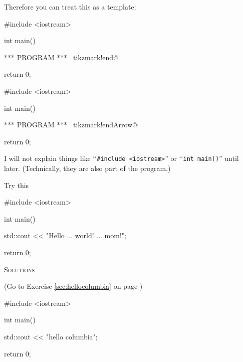 Therefore you can treat this as a template:


\begin{console}[commandchars=\~\!\@]
#include <iostream>

int main()
{

    *** PROGRAM *** ~tikzmark!end@

    return 0;
}
\end{console}
\begin{console}[commandchars=\~\!\@]
#include <iostream>

int main()
{

    *** PROGRAM *** ~tikzmark!endArrow@
    
    return 0;
}
\end{console}

I will not explain things like \lq\lq \verb!#include <iostream>!'' or \lq\lq\verb!int main()!'' until later. (Technically, they are also part of the program.)

Try this
\begin{console}
#include <iostream>

int main()
{
    std::cout << "Hello ... world! ... mom!\n";

    return 0;
}
\end{console}

%






\newpage\textsc{Solutions}

\begin{soln}\label{sec:hellocolumbia_soln}
(Go to Exercise \ref{sec:hellocolumbia} on page \pageref{sec:hellocolumbia})
\begin{console}
#include <iostream>

int main()
{
    std::cout << "hello columbia\n";

    return 0;
}
\end{console}
\end{soln}


